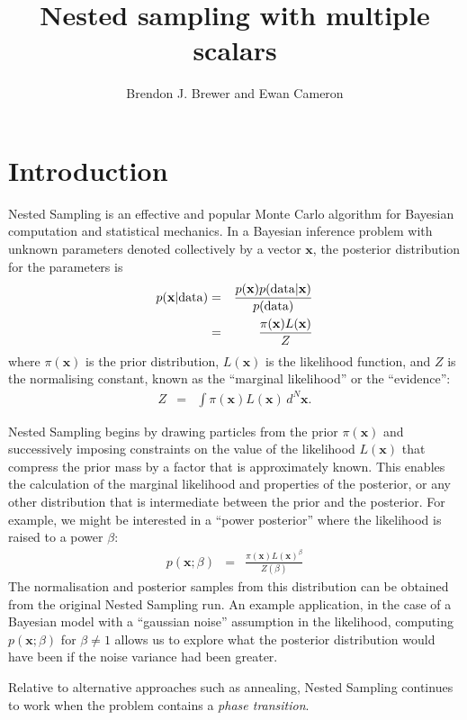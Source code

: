 \documentclass[a4paper, 11pt]{article}
\title{Nested sampling with multiple scalars}
\author{Brendon J. Brewer and Ewan Cameron}
\newcommand{\xx}{\mathbf{x}}	%
\newcommand{\dx}{d^N\mathbf{x}} %
\begin{document}
\maketitle


\section{Introduction}
Nested Sampling \citep{skilling} is an effective and popular
Monte Carlo algorithm for Bayesian computation and statistical mechanics.
In a Bayesian inference problem with unknown parameters denoted collectively
by a vector $\mathbf{x}$, the
posterior distribution for the parameters is
\begin{eqnarray}
p(\mathbf{x} | {\rm data}) &=&
\frac{p(\mathbf{x})p({\rm data} | \mathbf{x})}{p(\rm data)}\\
&=& \frac{\pi(\xx)L(\xx)}{Z}
\end{eqnarray}
where $\pi(\xx)$ is the prior distribution, $L(\xx)$ is the likelihood
function, and $Z$ is the normalising constant, known as the
``marginal likelihood'' or the ``evidence'':
\begin{eqnarray}
Z &=& \int \pi(\xx) L(\xx) \, \dx.
\end{eqnarray}

Nested Sampling begins by drawing particles from the
prior $\pi(\xx)$ and successively imposing constraints on the value of
the likelihood $L(\xx)$ that compress the prior mass by a
factor that is approximately known.
This enables the calculation of the marginal likelihood
and properties of the posterior, or any other distribution that is intermediate
between the prior and the posterior. For example, we might be interested in
a ``power posterior'' where the likelihood is raised to a power $\beta$:
\begin{eqnarray}
p(\xx; \beta) &=& \frac{\pi(\xx)L(\xx)^\beta}{Z(\beta)}
\end{eqnarray}
The normalisation and posterior samples from this distribution can be obtained
from the original Nested Sampling run. An example application, in the case of
a Bayesian model with a ``gaussian noise'' assumption in the likelihood,
computing $p(\xx; \beta)$ for $\beta \neq 1$ allows us to explore what the
posterior distribution would have been if the noise variance had been greater.

Relative to alternative approaches such as annealing, Nested Sampling continues
to work when the problem contains a {\it phase transition}.
\end{document}
